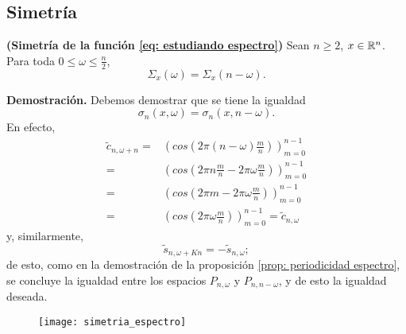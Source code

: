\subsection{Simetría}
\begin{prop}
\label{ref: simetria espectro}
\textbf{(Simetría de la función
\eqref{eq: estudiando espectro})}
Sean
$n \geq 2$,
$x \in \mathbb{R}^{n}$. Para toda $0 \leq \omega \leq \frac{n}{2}$,
\[
\Sigma_{x}(\omega) = \Sigma_{x}(n-\omega).
\]
\end{prop}
\noindent
\textbf{Demostración.}
Debemos demostrar que se tiene la igualdad 
\[
\sigma_{n}(x, \omega) = 
\sigma_{n}(x, n-\omega ).
\]
En efecto, 
\begin{align*}
\tilde{c}_{n, \omega + n} = & \left( cos \left( 2 \pi
\left( n- \omega \right) \frac{m}{n} \right) \right)_{m=0}^{n-1} \\
= & \left( cos \left( 
2 \pi n \frac{m}{n} - 2 \pi \omega
\frac{m}{n}
\right) \right)_{m=0}^{n-1} \\
= & \left( cos \left( 
2 \pi m - 2 \pi \omega \frac{m}{n} 
\right) \right)_{m=0}^{n-1} \\
= & \left( cos \left( 2 \pi \omega \frac{m}{n} \right) \right)_{m=0}^{n-1}
= \tilde{c}_{n, \omega}
\end{align*}
y, similarmente,
\[
\tilde{s}_{n, \omega + Kn} = -\tilde{s}_{n, \omega};
\]
de esto, como en la demostración de la proposición
\ref{prop: periodicidad espectro}, se concluye la igualdad
entre los espacios $P_{n, \omega}$ y $P_{n, n-\omega}$, y de esto
la igualdad deseada.
\QEDB
\vspace{0.2cm}

\begin{figure}[H]
	\centering
	\texttt{[image: simetria\_espectro]} 
\end{figure}	
 

